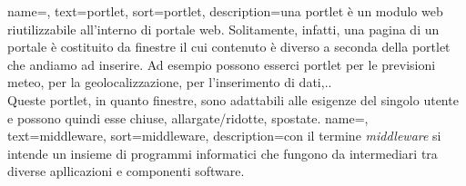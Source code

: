 {
	name=,
	text=portlet,
	sort=portlet,
	description={una portlet è un modulo web riutilizzabile all'interno di portale web. Solitamente, infatti, una pagina di un portale è costituito da finestre il cui contenuto è diverso a seconda della portlet che andiamo ad inserire. Ad esempio possono esserci portlet per le previsioni meteo, per la geolocalizzazione, per l'inserimento di dati,.. \\
	Queste portlet, in quanto finestre, sono adattabili alle esigenze del singolo utente e possono quindi esse chiuse, allargate/ridotte, spostate.}
}
{
	name=,
	text=middleware,
	sort=middleware,
	description={con il termine \emph{middleware} si intende un insieme di programmi informatici che fungono da intermediari tra diverse apllicazioni e componenti software.}
}